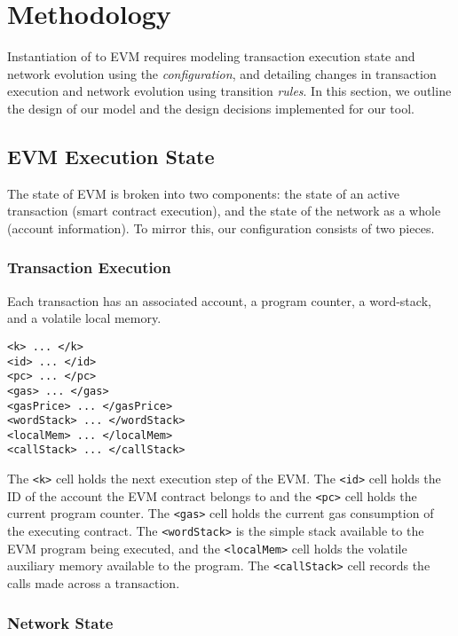 \section{Methodology}

Instantiation of \K{} to EVM requires modeling transaction execution state and
network evolution using the \textit{configuration}, and detailing
changes in transaction execution and network evolution using transition
\textit{rules}. In this section, we outline the design of our \K{} model and the
design decisions implemented for our tool.

\subsection{EVM Execution State}

The state of EVM is broken into two components: the state of an active
transaction (smart contract execution), and the state of the network as a whole
(account information). To mirror this, our configuration consists of two pieces.

\subsubsection{Transaction Execution}

Each transaction has an associated account, a program counter, a word-stack, and
a volatile local memory.

\begin{verbatim}
<k> ... </k>
<id> ... </id>
<pc> ... </pc>
<gas> ... </gas>
<gasPrice> ... </gasPrice>
<wordStack> ... </wordStack>
<localMem> ... </localMem>
<callStack> ... </callStack>
\end{verbatim}

The \texttt{<k>} cell holds the next execution step of the EVM. The
\texttt{<id>} cell holds the ID of the account the EVM contract belongs to and
the \texttt{<pc>} cell holds the current program counter. The \texttt{<gas>}
cell holds the current gas consumption of the executing contract. The
\texttt{<wordStack>} is the simple stack available to the EVM program being
executed, and the \texttt{<localMem>} cell holds the volatile auxiliary memory
available to the program. The \texttt{<callStack>} cell records the calls made
across a transaction.

\subsubsection{Network State}

